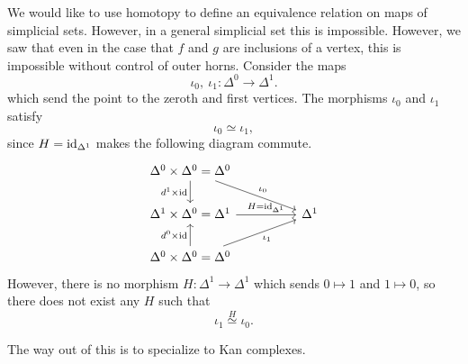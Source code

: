 \documentclass[main.tex]{subfiles}
\begin{document}
We would like to use homotopy to define an equivalence relation on maps of simplicial sets. However, in a general simplicial set this is impossible. However, we saw that even in the case that $f$ and $g$ are inclusions of a vertex, this is impossible without control of outer horns. Consider the maps
\begin{equation*}
  \iota_{0},\ \iota_{1}\colon \Delta^{0} \to \Delta^{1}.
\end{equation*}
which send the point to the zeroth and first vertices. The morphisms $\iota_{0}$ and $\iota_{1}$ satisfy
\begin{equation*}
  \iota_{0} \simeq  \iota_{1},
\end{equation*}
since $H = \mathrm{id}_{\Delta^{1}}$ makes the following diagram commute.
\begin{equation*}
  \begin{tikzcd}[column sep=huge]
    \Delta^{0} \times \Delta^{0} = \Delta^{0}
    \arrow[d, swap, "d^{1} \times \id"]
    \arrow[rd, "\iota_{0}"]
    \\
    \Delta^{1} \times \Delta^{0} = \Delta^{1}
    \arrow[r, "H = \id_{\Delta^{1}}"]
    & \Delta^{1}
    \\
    \Delta^{0} \times \Delta^{0} = \Delta^{0}
    \arrow[ru, swap, "\iota_{1}"]
    \arrow[u, "d^{0} \times \id"]
  \end{tikzcd}
\end{equation*}
However, there is no morphism $H\colon \Delta^{1} \to \Delta^{1}$ which sends $0 \mapsto 1$ and $1 \mapsto 0$, so there does not exist any $H$ such that
\begin{equation*}
  \iota_{1} \overset{H}{\simeq} \iota_{0}.
\end{equation*}

The way out of this is to specialize to Kan complexes.
\end{document}
